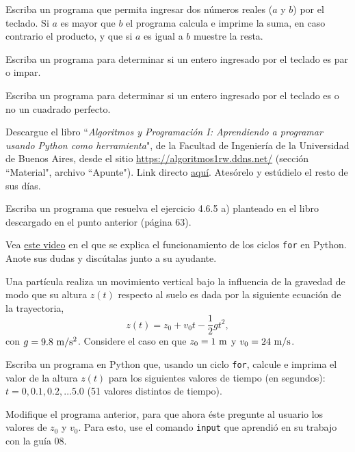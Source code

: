 \documentclass[11pt]{exam}
\begin{document}
\begin{questions}
\item Escriba un programa que permita ingresar dos números reales ($a$ y $b$) por el teclado. Si $a$ es mayor que $b$ el programa calcula e imprime la suma, en caso contrario el producto, y que si $a$ es igual a $b$ muestre la resta. 

\item Escriba un programa para determinar si un entero ingresado por el teclado es par o impar. 

\item Escriba un programa para determinar si un entero ingresado por el teclado es o no un cuadrado perfecto. 

\item Descargue el libro ``\textit{Algoritmos y Programación I: Aprendiendo a programar usando Python como herramienta}", de la Facultad de Ingeniería de la Universidad de Buenos Aires, desde el sitio \url{https://algoritmos1rw.ddns.net/} (sección ``Material", archivo ``Apunte"). Link directo \href{https://drive.google.com/file/d/0B0KKEIBDHL7tdEQ3bFZ2M3VrZzA/view}{aqu\'i}. Atesórelo y estúdielo el resto de sus días.

\item Escriba un programa que resuelva el ejercicio 4.6.5 a) planteado en el libro descargado en el punto anterior (página 63).

\item Vea \href{https://udec.instructure.com/courses/40179/pages/ciclos-for?module_item_id=1465536}{este video} en el que se explica el funcionamiento de los ciclos \texttt{for} en Python. Anote sus dudas y discútalas junto a su ayudante.

\item Una partícula realiza un movimiento vertical bajo la influencia de la gravedad de modo que su altura $z(t)$ respecto al suelo es dada por la siguiente ecuación de la trayectoria,
\begin{equation}
z(t)=z_0 + v_0 t -\frac{1}{2}gt^2,
\end{equation}
con $g=9.8 {\ \rm m/s^2}$. Considere el caso en que $z_0=1 {\ \rm m}$ y $v_0=24 {\ \rm m/s}$.

Escriba un programa en Python que, usando un ciclo \texttt{for}, calcule e imprima el valor de la altura $z(t)$ para los siguientes valores de tiempo (en segundos): $t=0, 0.1, 0.2, \dots 5.0$ (51 valores distintos de tiempo).

\item Modifique el programa anterior, para que ahora éste pregunte al usuario los valores de $z_0$ y $v_0$. Para esto, use el comando \texttt{input} que aprendió en su trabajo con la guía 08.


\end{questions}
\end{document}
